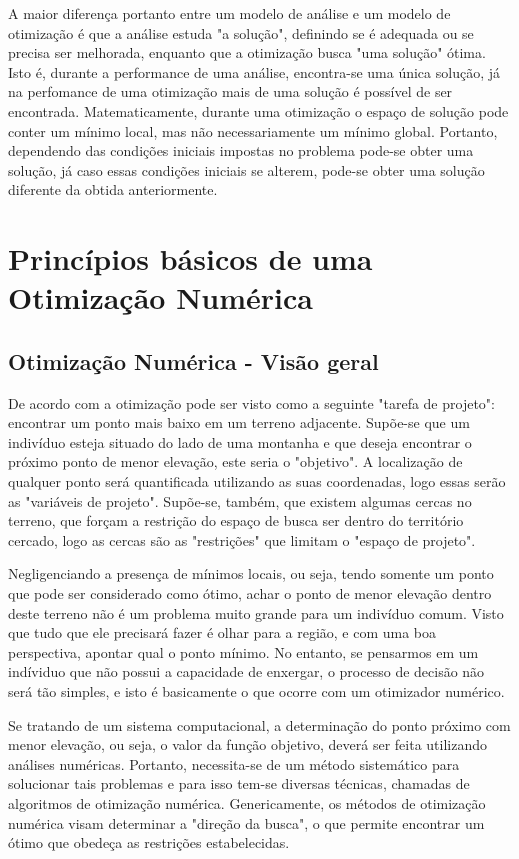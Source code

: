  A maior diferença portanto entre um modelo de análise e um modelo de otimização é que a análise estuda "a solução", definindo se é adequada ou se precisa ser melhorada, enquanto que a otimização busca "uma solução" ótima. Isto é, durante a performance de uma análise, encontra-se uma única solução, já na perfomance de uma otimização mais de uma solução é possível de ser encontrada. Matematicamente, durante uma otimização o espaço de solução pode conter um mínimo local, mas não necessariamente um mínimo global. Portanto, dependendo das condições iniciais impostas no problema pode-se obter uma solução, já caso essas condições iniciais se alterem, pode-se obter uma solução diferente da obtida anteriormente.

 \section{Princípios básicos de uma Otimização Numérica}
 \subsection{Otimização Numérica - Visão geral}
De acordo com \cite{moore1994msc} a otimização pode ser visto como a seguinte "tarefa de projeto": encontrar um ponto mais baixo em um terreno adjacente. Supõe-se que um indivíduo esteja situado do lado de uma montanha e que deseja encontrar o próximo ponto de menor elevação, este seria o "objetivo". A localização de qualquer ponto será quantificada utilizando as suas coordenadas, logo essas serão as "variáveis de projeto". Supõe-se, também, que existem algumas cercas no terreno, que forçam a restrição do espaço de busca ser dentro do território cercado, logo as cercas são as "restrições" que limitam o "espaço de projeto".

Negligenciando a presença de mínimos locais, ou seja, tendo somente um ponto que pode ser considerado como ótimo, achar o ponto de menor elevação dentro deste terreno não é um problema muito grande para um indivíduo comum. Visto que tudo que ele precisará fazer é olhar para a região, e com uma boa perspectiva, apontar qual o ponto mínimo.
No entanto, se pensarmos em um indíviduo que não possui a capacidade de enxergar, o processo de decisão não será tão simples, e isto é basicamente o que ocorre com um otimizador numérico.

Se tratando de um sistema computacional, a determinação do ponto próximo com menor elevação, ou seja, o valor da função objetivo, deverá ser feita utilizando análises numéricas. Portanto, necessita-se de um método sistemático para solucionar tais problemas e para isso tem-se diversas técnicas, chamadas de algoritmos de otimização numérica. Genericamente, os métodos de otimização numérica visam determinar a "direção da busca", o que permite encontrar um ótimo que obedeça as restrições estabelecidas.

